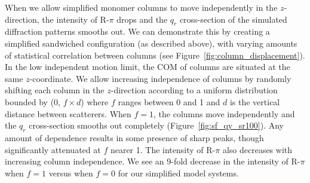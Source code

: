 %  
  
  When we allow simplified monomer columns to move independently in the
  $z$-direction, the intensity of R-$\pi$ drops and the $q_r$ cross-section of
  the simulated diffraction patterns smooths out. We can demonstrate this by
  creating a simplified sandwiched configuration (as described above), with
  varying amounts of statistical correlation between columns (see
  Figure~\ref{fig:column_displacement}). In the low independent motion limit, the
  COM of columns are situated at the same $z$-coordinate.  We allow increasing
  independence of columns by randomly shifting each column in the $z$-direction
  according to a uniform distribution bounded by (0, $f \times \mathit{d}$) where
  $f$ ranges between 0 and 1 and $d$ is the vertical distance between scatterers.
  When $f = 1$, the columns move independently and the $q_r$ cross-section
  smooths out completely (Figure~\ref{fig:sf_qy_sr100}). Any amount of dependence
  results in some presence of sharp peaks, though significantly attenuated at $f$
  nearer 1. The intensity of R-$\pi$ also decreases with increasing column
  independence. We see an 9-fold decrease in the intensity of R-$\pi$ when $f=1$
  versus when $f=0$ for our simplified model systems.

